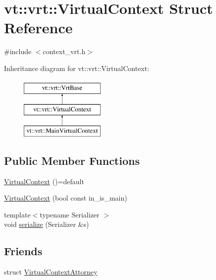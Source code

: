 \hypertarget{structvt_1_1vrt_1_1_virtual_context}{}\section{vt\+:\+:vrt\+:\+:Virtual\+Context Struct Reference}
\label{structvt_1_1vrt_1_1_virtual_context}


{\ttfamily \#include $<$context\+\_\+vrt.\+h$>$}

Inheritance diagram for vt\+:\+:vrt\+:\+:Virtual\+Context\+:\begin{figure}[H]
\begin{center}
\leavevmode
\includegraphics[height=3.000000cm]{structvt_1_1vrt_1_1_virtual_context}
\end{center}
\end{figure}
\subsection*{Public Member Functions}
\begin{DoxyCompactItemize}
\item 
\hyperlink{structvt_1_1vrt_1_1_virtual_context_a9958f214ea97abc63031ad1e02fffee8}{Virtual\+Context} ()=default
\item 
\hyperlink{structvt_1_1vrt_1_1_virtual_context_a8191db2145176e8ca47c38599adb0b57}{Virtual\+Context} (bool const in\+\_\+is\+\_\+main)
\item 
{\footnotesize template$<$typename Serializer $>$ }\\void \hyperlink{structvt_1_1vrt_1_1_virtual_context_a2fc163ea1aac29506aabab3fdcdac610}{serialize} (Serializer \&s)
\end{DoxyCompactItemize}
\subsection*{Friends}
\begin{DoxyCompactItemize}
\item 
struct \hyperlink{structvt_1_1vrt_1_1_virtual_context_a3c098ac4f050b85316f4ae9eef22a43e}{Virtual\+Context\+Attorney}
\end{DoxyCompactItemize}
